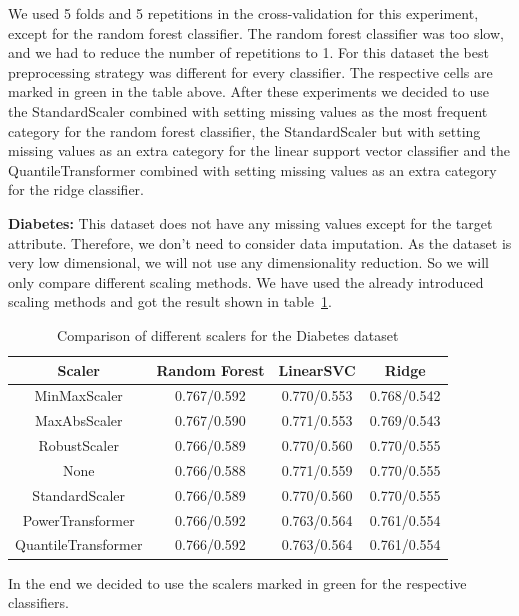 \documentclass[a4paper,10pt]{article}
\begin{document}
We used 5 folds and 5 repetitions in the cross-validation for this experiment, except for the random forest
classifier. The random forest classifier was too slow, and we had to reduce the number of repetitions to 1.
For this dataset the best
preprocessing strategy was different for every classifier. The respective cells are marked in green in the
table above. After these experiments we decided to use the StandardScaler combined with setting missing
values as the most frequent category for the random forest classifier, the StandardScaler but with setting
missing values as an extra category for the linear support vector classifier and the QuantileTransformer
combined with setting missing values as an extra category for the ridge classifier.

\textbf{Diabetes:} This dataset does not have any missing values except for the target attribute. Therefore, we 
 don't need to consider data imputation. As the dataset is very low dimensional, we will not use any dimensionality reduction. 
 So we will only compare different scaling methods. We have used the already introduced scaling methods 
 and got the result shown in table~\ref{table:diabetesscalers}.
 \begin{table}[h!]
\centering
\begin{tabular}{|c|c|c|c|}
\hline
\textbf{Scaler} & \textbf{Random Forest } & \textbf{LinearSVC } & \textbf{Ridge } \\
\hline
MinMaxScaler & \cellcolor[HTML]{C1E1C1}0.767/0.592 & 0.770/0.553 & 0.768/0.542 \\
\hline
MaxAbsScaler & 0.767/0.590 & 0.771/0.553 & 0.769/0.543 \\
\hline
RobustScaler & 0.766/0.589 & 0.770/0.560 & 0.770/0.555 \\
\hline
None & 0.766/0.588 & \cellcolor[HTML]{C1E1C1}0.771/0.559 & 0.770/0.555 \\
\hline
StandardScaler & 0.766/0.589 & 0.770/0.560 & \cellcolor[HTML]{C1E1C1}0.770/0.555 \\
\hline
PowerTransformer & 0.766/0.592 & 0.763/0.564 & 0.761/0.554 \\
\hline
QuantileTransformer & 0.766/0.592 & 0.763/0.564 & 0.761/0.554 \\
\hline
\end{tabular}
\caption{Comparison of different scalers for the Diabetes dataset}
\label{table:diabetesscalers}
\end{table}
In the end we decided to use the scalers marked in green for the respective classifiers.\\
\end{document}
